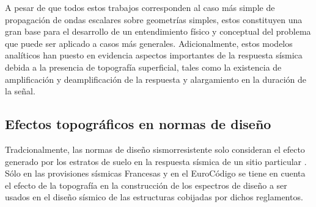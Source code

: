 \documentclass[spanish,letterpaper,12pt,twoside,openany]{article}
\begin{document}
A pesar de que todos estos trabajos corresponden al caso más simple de propagación de ondas escalares sobre geometrías simples, estos constituyen una gran base para el desarrollo de un entendimiento físico y conceptual del problema que puede ser aplicado a casos más generales. Adicionalmente, estos modelos analíticos han puesto en evidencia aspectos importantes de la respuesta sísmica debida a la presencia de topografía superficial, tales como la existencia de amplificación y deamplificación de la respuesta y alargamiento en la duración de la señal.
%
%
\subsection{Efectos topográficos en normas de diseño}
%
Tradcionalmente, las normas de diseño sismorresistente solo consideran el efecto generado por los estratos de suelo en la respuesta sísmica de un sitio particular \citep[][Sección A.2.4]{NSR-10}. Sólo en las provisiones sísmicas Francesas \citep{AFPS1995} y en el EuroCódigo \citep{EC8} se tiene en cuenta el efecto de la topografía en la construcción de los espectros de diseño a ser usados en el diseño sísmico de las estructuras cobijadas por dichos reglamentos.
\end{document}
